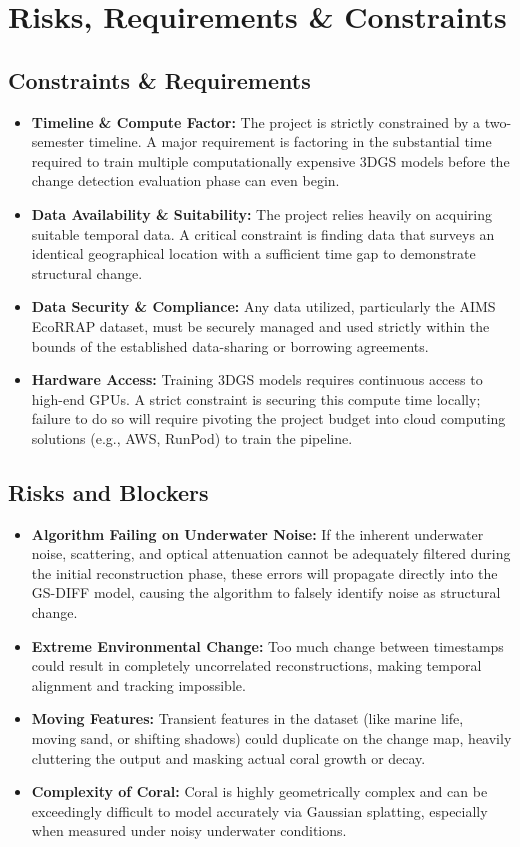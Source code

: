\chapter{Risks, Requirements \& Constraints}

\section{Constraints \& Requirements}
\begin{itemize}
    \item \textbf{Timeline \& Compute Factor:} The project is strictly constrained by a two-semester timeline. A major requirement is factoring in the substantial time required to train multiple computationally expensive 3DGS models before the change detection evaluation phase can even begin. 
    \item \textbf{Data Availability \& Suitability:} The project relies heavily on acquiring suitable temporal data. A critical constraint is finding data that surveys an identical geographical location with a sufficient time gap to demonstrate structural change.
    \item \textbf{Data Security \& Compliance:} Any data utilized, particularly the AIMS EcoRRAP dataset, must be securely managed and used strictly within the bounds of the established data-sharing or borrowing agreements.
    \item \textbf{Hardware Access:} Training 3DGS models requires continuous access to high-end GPUs. A strict constraint is securing this compute time locally; failure to do so will require pivoting the project budget into cloud computing solutions (e.g., AWS, RunPod) to train the pipeline.
\end{itemize}

\section{Risks and Blockers}
\begin{itemize}
    \item \textbf{Algorithm Failing on Underwater Noise:} If the inherent underwater noise, scattering, and optical attenuation cannot be adequately filtered during the initial reconstruction phase, these errors will propagate directly into the GS-DIFF model, causing the algorithm to falsely identify noise as structural change.
    \item \textbf{Extreme Environmental Change:} Too much change between timestamps could result in completely uncorrelated reconstructions, making temporal alignment and tracking impossible.
    \item \textbf{Moving Features:} Transient features in the dataset (like marine life, moving sand, or shifting shadows) could duplicate on the change map, heavily cluttering the output and masking actual coral growth or decay.
    \item \textbf{Complexity of Coral:} Coral is highly geometrically complex and can be exceedingly difficult to model accurately via Gaussian splatting, especially when measured under noisy underwater conditions.
\end{itemize}
